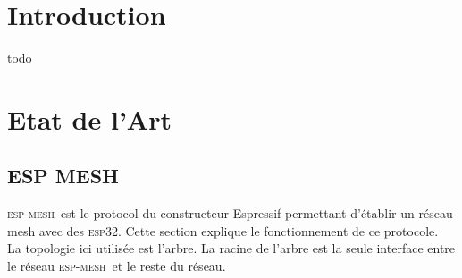 \documentclass[a4paper, 12pt]{report}
\newcommand{\esp}{\textsc{esp32}}
\newcommand{\espmesh}{\textsc{esp-mesh}}
\begin{document}
\chapter*{Introduction}
    todo

\tableofcontents
\newpage

\chapter{Etat de l'Art}

\section{ESP MESH}
    \espmesh\ est le protocol du constructeur Espressif permettant d'établir un réseau mesh avec des \esp.
    Cette section explique le fonctionnement de ce protocole.\\
    La topologie ici utilisée est l'arbre. La racine de l'arbre est la seule interface entre le
    réseau \espmesh\ et le reste du réseau.\\
\end{document}
